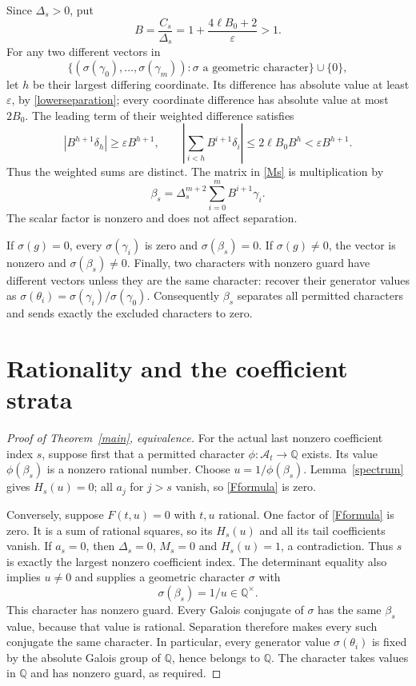 \documentclass[11pt]{article}
\newcommand{\Q}{\mathbb Q}\newcommand{\Z}{\mathbb Z}
\newcommand{\A}{\mathcal A}
\begin{document}
Since $\Delta_s>0$, put
\[
             B=\frac{C_s}{\Delta_s}
               =1+\frac{4\ell B_0+2}{\varepsilon}>1.
\]
For any two different vectors in
\[
 \bigl\{(\sigma(\gamma_0),\ldots,\sigma(\gamma_m)):\sigma
                 \text{ a geometric character}\bigr\}\cup\{0\},
\]
let $h$ be their largest differing coordinate. Its difference has absolute
value at least $\varepsilon$, by \eqref{lowerseparation}; every coordinate
difference has absolute value at most $2B_0$. The leading term of their
weighted difference satisfies
\[
 \left|B^{h+1}\delta_h\right|\ge\varepsilon B^{h+1},
 \qquad
 \left|\sum_{i<h}B^{i+1}\delta_i\right|
        \le2\ell B_0B^h<\varepsilon B^{h+1}.
\]
Thus the weighted sums are distinct. The matrix in \eqref{Ms} is
multiplication by
\[
 \beta_s=\Delta_s^{m+2}\sum_{i=0}^{m}B^{i+1}\gamma_i.
\]
The scalar factor is nonzero and does not affect separation.

If $\sigma(g)=0$, every $\sigma(\gamma_i)$ is zero and
$\sigma(\beta_s)=0$. If $\sigma(g)\ne0$, the vector is nonzero and
$\sigma(\beta_s)\ne0$. Finally, two characters with nonzero guard have
different vectors unless they are the same character: recover their
generator values as $\sigma(\theta_i)=\sigma(\gamma_i)/\sigma(\gamma_0)$.
Consequently $\beta_s$ separates all permitted characters and sends
exactly the excluded characters to zero.

\section{Rationality and the coefficient strata}

\begin{proof}[Proof of Theorem~\ref{main}, equivalence]
For the actual last nonzero coefficient index $s$, suppose first that a
permitted character $\phi:\A_t\to\Q$ exists. Its value
$\phi(\beta_s)$ is a nonzero rational number. Choose
$u=1/\phi(\beta_s)$. Lemma~\ref{spectrum} gives $H_s(u)=0$;
all $a_j$ for $j>s$ vanish, so \eqref{Fformula} is zero.

Conversely, suppose $F(t,u)=0$ with $t,u$ rational. One factor of
\eqref{Fformula} is zero. It is a sum of rational squares, so its
$H_s(u)$ and all its tail coefficients vanish. If $a_s=0$, then
$\Delta_s=0$, $M_s=0$ and $H_s(u)=1$, a contradiction. Thus $s$ is
exactly the largest nonzero coefficient index. The determinant equality
also implies $u\ne0$ and supplies a geometric character $\sigma$ with
\[
                         \sigma(\beta_s)=1/u\in\Q^\times.
\]
This character has nonzero guard. Every Galois conjugate of $\sigma$
has the same $\beta_s$ value, because that value is rational. Separation
therefore makes every such conjugate the same character. In particular,
every generator value $\sigma(\theta_i)$ is fixed by the absolute
Galois group of $\Q$, hence belongs to $\Q$. The character takes values
in $\Q$ and has nonzero guard, as required.
\end{proof}
\end{document}
